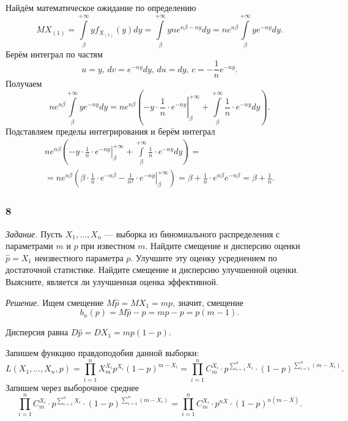Найдём математическое ожидание  по определению
$$MX_{ \left( 1 \right) } =
  \int \limits_{ \beta }^{+ \infty } yf_{X_{ \left( 1 \right) }} \left( y \right) dy =
  \int \limits_{ \beta }^{+ \infty } yne^{n \beta - ny} dy =
  ne^{n \beta } \int \limits_{ \beta }^{+ \infty } ye^{-ny} dy.$$
Берём интеграл по частям
$$u = y, \,
  dv = e^{-ny} dy, \,
  du = dy, \,
  c = - \frac{1}{n} e^{-ny}.$$
Получаем
$$ne^{n \beta } \int \limits_{ \beta }^{+ \infty } ye^{-ny} dy =
  ne^{n \beta } \left(
    \left. -y \cdot \frac{1}{n} \cdot e^{-ny} \right|_{ \beta }^{+ \infty } +
    \int \limits_{ \beta }^{+ \infty } \frac{1}{n} \cdot e^{-ny} dy
  \right).$$
Подставляем пределы интегрирования и берём интеграл
\begin{equation*}
  \begin{split}
    ne^{n \beta } \left(
      \left. -y \cdot \frac{1}{n} \cdot e^{-ny} \right|_{ \beta }^{+ \infty } +
      \int \limits_{ \beta }^{+ \infty } \frac{1}{n} \cdot e^{-ny} dy
    \right) = \\
    = ne^{n \beta } \left(
      \beta \cdot \frac{1}{n} \cdot e^{-n \beta } -
      \left. \frac{1}{n^2} \cdot e^{-ny} \right|_{ \beta }^{+ \infty }
    \right) =
    \beta + \frac{1}{n} \cdot e^{n \beta } e^{-n \beta } =
    \beta + \frac{1}{n}.
  \end{split}
\end{equation*}

\subsubsection*{8}

\textit{Задание.}
Пусть $X_1, \dotsc, X_n$ ---
выборка из биномиального распределения с параметрами $m$ и $p$ при известном $m$.
Найдите смещение и дисперсию оценки $ \hat{p} = X_1$ неизвестного параметра $p$.
Улучшите эту оценку усреднением по достаточной статистике.
Найдите смещение и дисперсию улучшенной оценки.
Выясните, является ли улучшенная оценка эффективной.

\textit{Решение.}
Ищем смещение $M \hat{p} = MX_1 = mp$, значит,
смещение
$$b_n \left( p \right) =
  M \hat{p} - p =
  mp - p =
  p \left( m - 1 \right).$$

Дисперсия равна $D \hat{p} = DX_1 = mp \left( 1 - p \right) $.

Запишем функцию правдоподобия данной выборки:
$$L \left( X_1, \dotsc, X_n, p \right) =
  \prod \limits_{i = 1}^n X_m^{X_i} p^{X_i} \left( 1 - p \right)^{m - X_i} =
  \prod \limits_{i = 1}^n C_m^{X_i} \cdot p^{ \sum \limits_{i = 1}^n X_i} \cdot
  \left( 1 - p \right)^{ \sum \limits_{i = 1}^n \left( m - X_i \right) }.$$
Запишем через выборочное среднее
$$ \prod \limits_{i = 1}^n C_m^{X_i} \cdot p^{ \sum \limits_{i = 1}^n X_i} \cdot
  \left( 1 - p \right)^{ \sum \limits_{i = 1}^n \left( m - X_i \right) } =
  \prod \limits_{i = 1}^n C_m^{X_i} \cdot p^{n \overline{X}} \cdot
  \left( 1 - p \right)^{n \left( m - \overline{X} \right) }.$$

